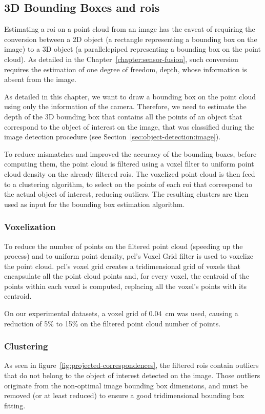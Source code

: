 \subsection{3D Bounding Boxes and \aclp{roi}}
\label{subsec:object-detection:bounding-boxes-and-roi}
Estimating a \ac{roi} on a point cloud from an image has the caveat of requiring the conversion between a 2D object (a rectangle representing a bounding box on the image) to a 3D object (a parallelepiped representing a bounding box on the point cloud). As detailed in the Chapter~\ref{chapter:sensor-fusion}, such conversion requires the estimation of one degree of freedom, depth, whose information is absent from the image.

As detailed in this chapter, we want to draw a bounding box on the point cloud using only the information of the camera. Therefore, we need to estimate the depth of the 3D bounding box that contains all the points of an object that correspond to the object of interest on the image, that was classified during the image detection procedure (see Section~\ref{sec:object-detection:image}).

To reduce mismatches and improved the accuracy of the bounding boxes, before computing them, the point cloud is filtered using a voxel filter to uniform point cloud density on the already filtered \acp{roi}. The voxelized point cloud is then feed to a clustering algorithm, to select on the points of each \ac{roi} that correspond to the actual object of interest, reducing outliers. The resulting clusters are then used as input for the bounding box estimation algorithm.


\subsubsection{Voxelization}
To reduce the number of points on the filtered point cloud (speeding up the process) and to uniform point density, \ac{pcl}'s Voxel Grid filter is used to voxelize the point cloud. \ac{pcl}'s voxel grid creates a tridimensional grid of voxels that encapsulate all the point cloud points and, for every voxel, the centroid of the points within each voxel is computed, replacing all the voxel's points with its centroid.

On our experimental datasets, a voxel grid of \SI{0.04}{\centi\meter} was used, causing a reduction of 5\% to 15\% on the filtered point cloud number of points.

\subsubsection{Clustering}
As seen in figure~\ref{fig:projected-correspondences}, the filtered \acp{roi} contain outliers that do not belong to the object of interest detected on the image. Those outliers originate from the non-optimal image bounding box dimensions, and must be removed (or at least reduced) to ensure a good tridimensional bounding box fitting.

